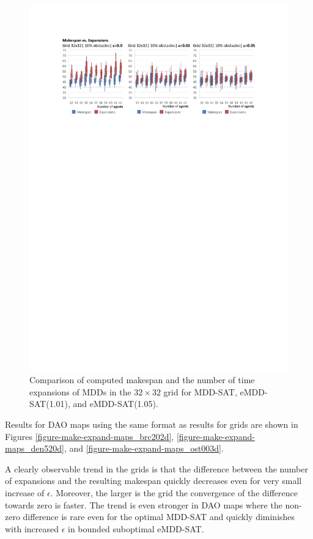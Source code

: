 \documentclass[jair,oneside,11pt]{article}
\begin{document}
\begin{figure}[h]
\centering
\includegraphics[trim={2.5cm 20.8cm 2.5cm 2.7cm},clip,width=1.0\textwidth]{expr_grids-make-expand_32x32.pdf}
\vspace{-0.6cm}\caption{Comparison of computed makespan and the number of time expansions of MDDs in the $32{}\times{}32$ grid for MDD-SAT, eMDD-SAT(1.01), and eMDD-SAT(1.05).}
\label{figure-make-expand-grids_32x32}
\end{figure}

Results for DAO maps using the same format as results for grids are shown in Figures \ref{figure-make-expand-maps_brc202d}, \ref{figure-make-expand-maps_den520d}, and \ref{figure-make-expand-maps_ost003d}.

A clearly observable trend in the grids is that the difference between the number of expansions and the resulting makespan quickly decreases even for very small increase of $\epsilon$. Moreover, the larger is the grid the convergence of the difference towards zero is faster. The trend is even stronger in DAO maps where the non-zero difference is rare even for the optimal MDD-SAT and quickly diminishes with increased $\epsilon$ in bounded suboptimal eMDD-SAT.
\end{document}

